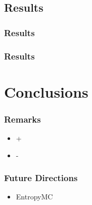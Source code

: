 \documentclass[10pt,handout]{beamer}
\begin{document}

\subsection{Results}

\begin{frame}
\frametitle{Results}


\end{frame}



\begin{frame}
\frametitle{Results}

\end{frame}



\section{Conclusions}


\begin{frame}
\frametitle{Remarks}

\begin{itemize}[<+->]
	\item +
	\item -

\end{itemize}


\end{frame}


\begin{frame}
\frametitle{Future Directions}

\begin{itemize}
	\item EntropyMC
\end{itemize}

\end{frame}


%
\end{document}
